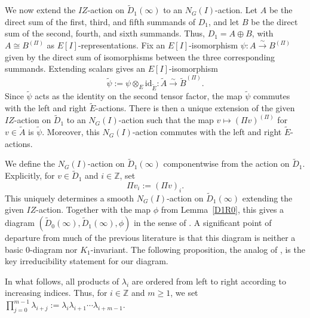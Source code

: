 \documentclass[a4paper,10pt,twoside]{amsart}
\theoremstyle{definition}
\numberwithin{equation}{section}
\begin{document}
We now extend the \(IZ\)-action on \(\widetilde D_1(\infty)\) to an
\(N_G(I)\)-action. Let \(A\) be
the direct sum of the first, third, and fifth summands of \(D_1\), and let
\(B\) be the direct sum of the second, fourth, and sixth summands. Thus,
\(D_1=A\oplus B\), with \(A\cong B^{(\Pi)}\) as \(E[I]\)-representations. Fix an \(E[I]\)-isomorphism
\(\psi:A\xrightarrow{\sim}B^{(\Pi)}\) given by the direct sum of isomorphisms between the three corresponding summands. Extending scalars gives an
\(E[I]\)-isomorphism
\begin{equation}\label{ABpsi}
\widetilde\psi:=\psi\otimes_E \mathrm{id}_{\widetilde E}:
\widetilde A\xrightarrow{\sim}\widetilde B^{(\Pi)}.
\end{equation}
Since \(\widetilde\psi\) acts as the identity on the second tensor
factor, the map \(\widetilde\psi\) commutes
with the left and right \(\widetilde E\)-actions. There is then a
unique extension of the given \(IZ\)-action on \(\widetilde D_1\) to an
\(N_G(I)\)-action such that the map $v \mapsto (\Pi v)^{(\Pi)}$ for $v \in \widetilde{A}$ is $\widetilde{\psi}$. Moreover, this \(N_G(I)\)-action commutes with
the left and right \(\widetilde E\)-actions.

We define the \(N_G(I)\)-action on \(\widetilde D_1(\infty)\) componentwise
from the action on \(\widetilde D_1\). Explicitly, for
\(v\in\widetilde D_1\) and \(i\in\mathbb Z\), set
\begin{equation}\label{Pi action}
\Pi v_i := (\Pi v)_i .
 \end{equation}
This uniquely determines a smooth \(N_G(I)\)-action on
\(\widetilde D_1(\infty)\) extending the given \(IZ\)-action. Together with the map \(\phi\) from Lemma~\ref{D1R0},
this gives a diagram
\((\widetilde D_0(\infty),\widetilde D_1(\infty),\phi)\)
in the sense of \cite[\S9]{BP12}. A significant point of departure from
much of the previous literature is that this diagram is neither
a basic \(0\)-diagram nor \(K_1\)-invariant. The following proposition, the
analog of \cite[Proposition~2.1]{Le24}, is the key irreducibility statement
for our diagram.

In what follows, all products of \(\lambda_i\) are ordered from
left to right according to increasing indices. Thus, for
\(i\in\mathbb Z\) and \(m\geq 1\), we set \(
\prod_{j=0}^{m-1}\lambda_{i+j}
:=
\lambda_i\lambda_{i+1}\cdots\lambda_{i+m-1}.
\)
\end{document}
